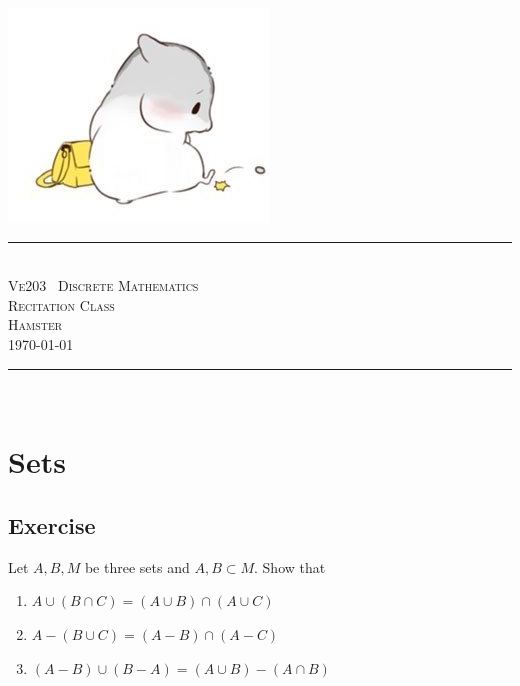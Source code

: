 \documentclass[12pt]{article}
\begin{document}
\begin{center}
    \includegraphics[scale=0.7]{hamster.jpg}  \\
    \rule{\linewidth}{0.2 mm} \\[0.4 cm]
    \textsc{\LARGE  Ve203 \ Discrete Mathematics}\\[0.3 cm]
    \textsc{\LARGE  Recitation Class}\\[0.7 cm]		
    \textsc{\large Hamster\\ \today}
    \rule{\linewidth}{0.2 mm} \\[0.5 cm]
\end{center}
    \begin{minipage}{\textwidth}
        \tableofcontents
    \end{minipage}
\newpage
\section{Sets}
\subsection{Exercise}
\par Let $A,B,M$ be three sets and $A,B \subset M$. Show that 
\begin{enumerate}
	\item $A \cup(B \cap C)=(A \cup B) \cap(A \cup C)$
	\item $A-(B \cup C)=(A-B) \cap(A-C)$
	\item $(A - B) \cup (B - A) = (A \cup B) - (A \cap B)$
\end{enumerate}
\end{document}
